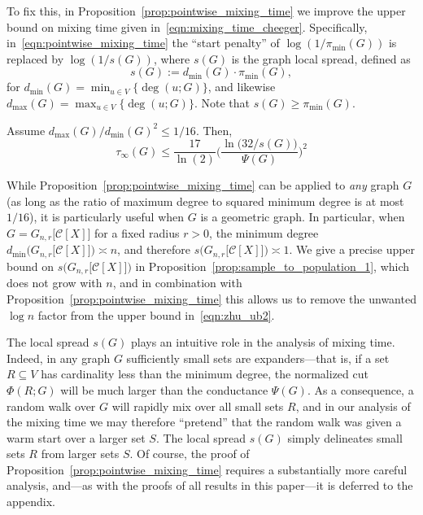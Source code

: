 \documentclass[11pt,twoside]{article}
\newcommand{\1}{\mathbf{1}}
\newcommand{\mc}[1]{\mathcal{#1}}
\begin{document}
To fix this, in Proposition~\ref{prop:pointwise_mixing_time} we improve the upper bound on mixing time given in~\eqref{eqn:mixing_time_cheeger}. Specifically, in~\eqref{eqn:pointwise_mixing_time} the ``start penalty'' of $\log(1/\pi_{\min}(G))$ is replaced by $\log(1/s(G))$, where $s(G)$ is the graph local spread, defined as
\begin{equation*}
s(G) := d_{\min}(G) \cdot \pi_{\min}(G),
\end{equation*}
for $d_{\min}(G) = \min_{u \in V}\bigl\{\deg(u;G)\bigr\}$, and likewise $d_{\max}(G) = \max_{u \in V}\bigl\{\deg(u;G)\bigr\}$. Note that $s(G) \geq \pi_{\min}(G)$.
\begin{proposition}
	\label{prop:pointwise_mixing_time}
	Assume $d_{\max}(G)/d_{\min}(G)^2 \leq 1/16$. Then,
	\begin{equation}
	\label{eqn:pointwise_mixing_time}
	\tau_{\infty}(G) \leq \frac{17}{\ln(2)} \biggl(\frac{\ln\bigl(32/s(G)\bigr)}{\Psi(G)}\biggr)^2
	\end{equation}
\end{proposition}
While Proposition~\ref{prop:pointwise_mixing_time} can be applied to \emph{any} graph $G$ (as long as the ratio of maximum degree to squared minimum degree is at most $1/16$), it is particularly useful when $G$ is a geometric graph. In particular, when $G = G_{n,r}\bigl[\mc{C}[X]\bigr]$ for a fixed radius $r > 0$, the minimum degree $d_{\min}\bigl(G_{n,r}\bigl[\mc{C}[X]\bigr]\bigr) \asymp n$, and therefore $s\bigl(G_{n,r}\bigl[\mc{C}[X]\bigr]\bigr) \asymp 1$. We give a precise upper bound on $s\bigl(G_{n,r}\bigl[\mc{C}[X]\bigr]\bigr)$ in Proposition~\ref{prop:sample_to_population_1}, which does not grow with $n$, and in combination with Proposition~\ref{prop:pointwise_mixing_time} this allows us to remove the unwanted $\log n$ factor from the upper bound in~\eqref{eqn:zhu_ub2}. 

The local spread $s(G)$ plays an intuitive role in the analysis of mixing time. Indeed, in any graph $G$ sufficiently small sets are expanders---that is, if a set $R \subseteq V$ has cardinality less than the minimum degree, the normalized cut $\Phi(R;G)$ will be much larger than the conductance $\Psi(G)$. As a consequence, a random walk over $G$ will rapidly mix over all small sets $R$, and in our analysis of the mixing time we may therefore ``pretend'' that the random walk was given a warm start over a larger set $S$. The local spread $s(G)$ simply delineates small sets $R$ from larger sets $S$. Of course, the proof of Proposition~\ref{prop:pointwise_mixing_time} requires a substantially more careful analysis, and---as with the proofs of all results in this paper---it is deferred to the appendix.
\end{document}
